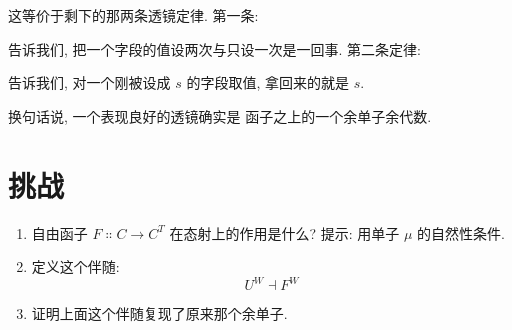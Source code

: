 这等价于剩下的那两条透镜定律. 第一条:

告诉我们, 把一个字段的值设两次与只设一次是一回事. 第二条定律:

告诉我们, 对一个刚被设成 $s$ 的字段取值, 拿回来的就是 $s$.

换句话说, 一个表现良好的透镜确实是  函子之上的一个余单子余代数.

\section{挑战}

\begin{enumerate}
  \tightlist
  \item
        自由函子 $F \Colon C \to C^T$ 在态射上的作用是什么? 提示: 用单子
        $\mu$ 的自然性条件.
  \item
        定义这个伴随:
        \[U^W \dashv F^W\]
  \item
        证明上面这个伴随复现了原来那个余单子.
\end{enumerate}
